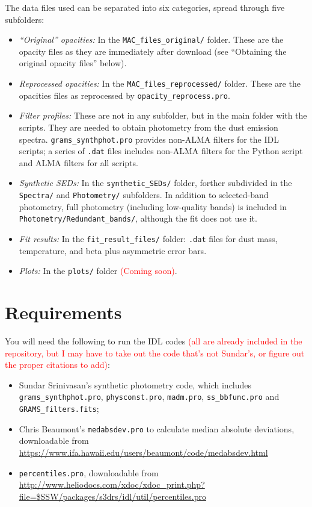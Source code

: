 \documentclass{article}
\begin{document}
 The data files used can be separated into six categories, spread through five subfolders:
\begin{itemize}
\item {\it ``Original'' opacities:} In the {\tt MAC\_files\_original/} folder. These are the opacity files as they are immediately after download (see ``Obtaining the original opacity files'' below). 
\item {\it Reprocessed opacities:} In the {\tt MAC\_files\_reprocessed/} folder. These are the opacities files as reprocessed by {\tt opacity\_reprocess.pro}.
\item {\it Filter profiles:} These are not in any subfolder, but in the main folder with the scripts. They are needed to obtain photometry from the dust emission spectra. {\tt grams\_synthphot.pro} provides non-ALMA filters for the IDL scripts; a series of {\tt .dat} files includes non-ALMA filters for the Python script and ALMA filters for all scripts.
\item {\it Synthetic SEDs:} In the {\tt synthetic\_SEDs/} folder, forther subdivided in the {\tt Spectra/} and {\tt Photometry/} subfolders. In addition to selected-band photometry, full photometry (including low-quality bands) is included in {\tt Photometry/Redundant\_bands/}, although the fit does not use it.
\item {\it Fit results:} In the {\tt fit\_result\_files/} folder: {\tt .dat} files for dust mass, temperature, and beta plus asymmetric error bars.
\item {\it Plots:} In the {\tt plots/} folder \textcolor{red}{(Coming soon)}.
\end{itemize}


\section*{Requirements}

You will need the following to run the IDL codes \textcolor{red}{(all are already included in the repository, but I may have to take out the code that's not Sundar's, or figure out the proper citations to add)}:
\begin{itemize}
\item Sundar Srinivasan's synthetic photometry code, which includes {\tt grams\_synthphot.pro}, {\tt physconst.pro}, {\tt madm.pro}, {\tt ss\_bbfunc.pro} and {\tt GRAMS\_filters.fits};
\item Chris Beaumont's {\tt medabsdev.pro} to calculate median absolute deviations, downloadable from \url{https://www.ifa.hawaii.edu/users/beaumont/code/medabsdev.html}
\item {\tt percentiles.pro}, downloadable from \url{http://www.heliodocs.com/xdoc/xdoc_print.php?file=$SSW/packages/s3drs/idl/util/percentiles.pro}
\end{itemize}
\end{document}
